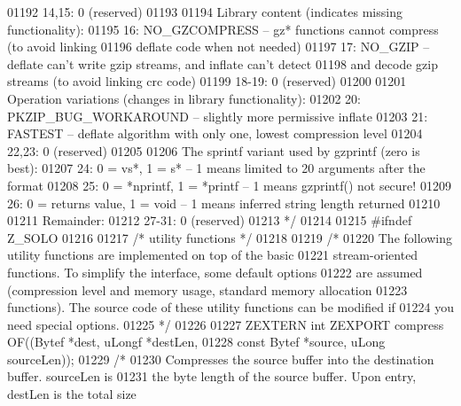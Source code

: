 \begin{DoxyCode}
01192 \textcolor{comment}{     14,15: 0 (reserved)}
01193 \textcolor{comment}{}
01194 \textcolor{comment}{    Library content (indicates missing functionality):}
01195 \textcolor{comment}{     16: NO\_GZCOMPRESS -- gz* functions cannot compress (to avoid linking}
01196 \textcolor{comment}{                          deflate code when not needed)}
01197 \textcolor{comment}{     17: NO\_GZIP -- deflate can't write gzip streams, and inflate can't detect}
01198 \textcolor{comment}{                    and decode gzip streams (to avoid linking crc code)}
01199 \textcolor{comment}{     18-19: 0 (reserved)}
01200 \textcolor{comment}{}
01201 \textcolor{comment}{    Operation variations (changes in library functionality):}
01202 \textcolor{comment}{     20: PKZIP\_BUG\_WORKAROUND -- slightly more permissive inflate}
01203 \textcolor{comment}{     21: FASTEST -- deflate algorithm with only one, lowest compression level}
01204 \textcolor{comment}{     22,23: 0 (reserved)}
01205 \textcolor{comment}{}
01206 \textcolor{comment}{    The sprintf variant used by gzprintf (zero is best):}
01207 \textcolor{comment}{     24: 0 = vs*, 1 = s* -- 1 means limited to 20 arguments after the format}
01208 \textcolor{comment}{     25: 0 = *nprintf, 1 = *printf -- 1 means gzprintf() not secure!}
01209 \textcolor{comment}{     26: 0 = returns value, 1 = void -- 1 means inferred string length returned}
01210 \textcolor{comment}{}
01211 \textcolor{comment}{    Remainder:}
01212 \textcolor{comment}{     27-31: 0 (reserved)}
01213 \textcolor{comment}{ */}
01214 
01215 \textcolor{preprocessor}{#ifndef Z\_SOLO}
01216 
01217                         \textcolor{comment}{/* utility functions */}
01218 
01219 \textcolor{comment}{/*}
01220 \textcolor{comment}{     The following utility functions are implemented on top of the basic}
01221 \textcolor{comment}{   stream-oriented functions.  To simplify the interface, some default options}
01222 \textcolor{comment}{   are assumed (compression level and memory usage, standard memory allocation}
01223 \textcolor{comment}{   functions).  The source code of these utility functions can be modified if}
01224 \textcolor{comment}{   you need special options.}
01225 \textcolor{comment}{*/}
01226 
01227 ZEXTERN \textcolor{keywordtype}{int} ZEXPORT compress OF((Bytef *dest,   uLongf *destLen,
01228                                  \textcolor{keyword}{const} Bytef *source, uLong sourceLen));
01229 \textcolor{comment}{/*}
01230 \textcolor{comment}{     Compresses the source buffer into the destination buffer.  sourceLen is}
01231 \textcolor{comment}{   the byte length of the source buffer.  Upon entry, destLen is the total size}

\end{DoxyCode}
